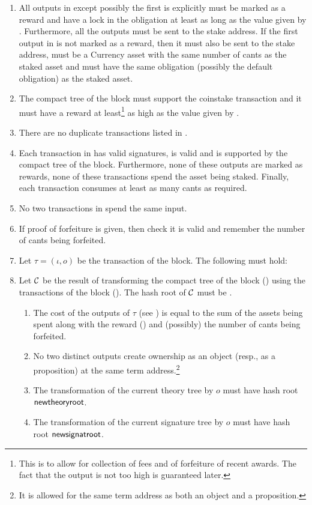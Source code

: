 \begin{itemize}
\begin{enumerate}
\item All outputs in {} except possibly the first is explicitly must be marked as a reward
and
have a lock in the obligation at least as long as the value given by {}.
Furthermore, all the outputs must be sent to the stake address.
If the first output in {} is not marked as a reward, then it must also
be sent to the stake address, must be a Currency asset with the same number of cants as the staked asset
and must have the same obligation (possibly the default {} obligation) as the staked asset.
\item The compact tree of the block must support the coinstake transaction
and it must have a reward at least\footnote{This is to allow for collection of fees and of forfeiture of recent awards. The fact that the output is not too high is guaranteed later.}
as high as the value given by {}.
\item There are no duplicate transactions listed in {}.
\item Each transaction in {} has valid signatures, is valid and is supported by the compact tree of the block. Furthermore, none of these outputs are marked as rewards, none of these transactions spend the asset being staked. Finally, each transaction consumes at least as many cants as required.
\item No two transactions in {} spend the same input.
\item If proof of forfeiture is given, then check it is valid and remember the number of cants being forfeited.
\item Let $\tau=(\iota,o)$ be the transaction of the block. The following must hold:
\item Let $\mathcal{C}$ be the result of transforming the compact tree of the block ({})
using the transactions of the block ({}).
The hash root of $\mathcal{C}$ must be {}.
\begin{enumerate}
\item The cost of the outputs of $\tau$ (see {})
is equal to the sum of the assets being spent
along with the reward ({})
and (possibly) the number of cants being forfeited.
\item No two distinct outputs create ownership as an object (resp., as a proposition) at the same term address.\footnote{It is allowed for the same term address as both an object and a proposition.}
\item The transformation of the current theory tree by $o$ must have hash root $\field{newtheoryroot}$.
\item The transformation of the current signature tree by $o$ must have hash root $\field{newsignatroot}$.
\end{enumerate}
\end{enumerate}
\end{itemize}


